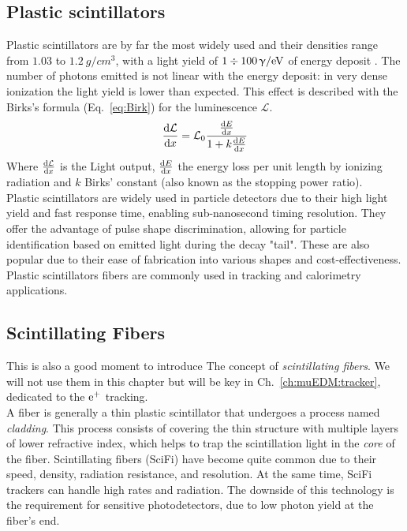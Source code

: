 \begin{refsection}
    \subsection{Plastic scintillators}
        Plastic scintillators are by far the most widely used and their densities range from $1.03$ to $\SI{1.2}{g\per cm^3}$, with a light yield of $1\divisionsymbol\SI{100}{\upgamma/eV}$ of energy deposit \cite{PDG}.
        The number of photons emitted is not linear with the energy deposit: in very dense ionization the light yield is lower than expected.
        This effect is described with the Birks's formula (Eq.~\ref{eq:Birk}) for the luminescence $\mathcal{L}$.
        \begin{equation}
            \dv{\mathcal{L}}{x} = \mathcal{L}_0 \frac{\dv{E}{x}}{1 + k \dv{E}{x}}
            \label{eq:Birk}
        \end{equation}
        Where $\dv{\mathcal{L}}{x}$ is the Light output, $\dv{E}{x}$ the energy loss per unit length by ionizing radiation and $k$ Birks' constant (also known as the stopping power ratio).\\
        Plastic scintillators are widely used in particle detectors due to their high light yield and fast response time, enabling sub-nanosecond timing resolution. 
        They offer the advantage of pulse shape discrimination, allowing for particle identification based on emitted light during the decay "tail".
        These are also popular due to their ease of fabrication into various shapes and cost-effectiveness. 
        Plastic scintillators fibers are commonly used in tracking and calorimetry applications.

    \subsection{Scintillating Fibers}
        This is also a good moment to introduce The concept of \textit{scintillating fibers}.
        We will not use them in this chapter but will be key in Ch.~\ref{ch:muEDM:tracker}, dedicated to the $\text{e}^+$ tracking.\\
        A fiber is generally a thin plastic scintillator that undergoes a process named \textit{cladding}.
        This process consists of covering the thin structure with multiple layers of lower refractive index, which helps to trap the scintillation light in the \textit{core} of the fiber.
        Scintillating fibers (SciFi) have become quite common due to their speed, density, radiation resistance, and resolution. 
        At the same time, SciFi trackers can handle high rates and radiation. 
        The downside of this technology is the requirement for sensitive photodetectors, due to low photon yield at the fiber's end. 


\end{refsection}

